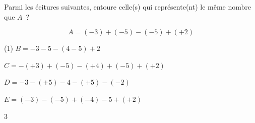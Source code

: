\documentclass[a4paper,11pt]{report}
\begin{document}
\begin{exop}
{Parmi les écitures suivantes, entoure celle(s) qui représente(nt) le même nombre que $A$~?

$$A=(-3)+(-5)-(-5)+(+2)$$

\begin{tasks}(1)
	\task[] $B=-3-5-(4-5)+2$

	\task[] $C=-(+3)+(-5)-(+4)+(-5)+(+2)$

	\task[] $D=-3-(+5)-4-(+5)-(-2)$

	\task[] $E=(-3)-(-5)+(-4)-5+(+2)$
\end{tasks}
}{3}
\end{exop}


\end{document}
